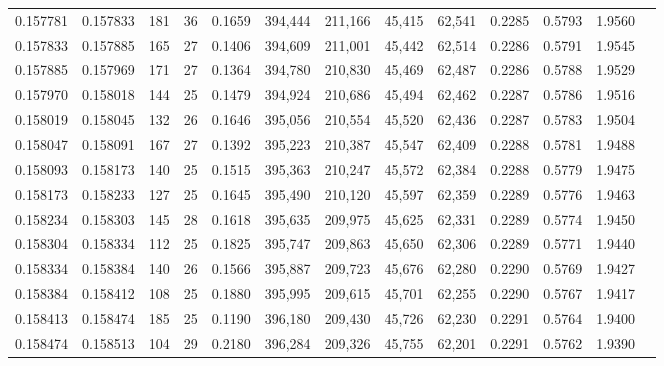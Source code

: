\begin{tabular}{rrrrrrrrrrrrr}
0.157781 & 0.157833 & 181 &  36 &                                     0.1659 & 394,444 & 211,166 &  45,415 &  62,541 & 0.2285 & 0.5793 & 1.9560 \\
0.157833 & 0.157885 & 165 &  27 &                                     0.1406 & 394,609 & 211,001 &  45,442 &  62,514 & 0.2286 & 0.5791 & 1.9545 \\
0.157885 & 0.157969 & 171 &  27 &                                     0.1364 & 394,780 & 210,830 &  45,469 &  62,487 & 0.2286 & 0.5788 & 1.9529 \\
0.157970 & 0.158018 & 144 &  25 &                                     0.1479 & 394,924 & 210,686 &  45,494 &  62,462 & 0.2287 & 0.5786 & 1.9516 \\
0.158019 & 0.158045 & 132 &  26 &                                     0.1646 & 395,056 & 210,554 &  45,520 &  62,436 & 0.2287 & 0.5783 & 1.9504 \\
0.158047 & 0.158091 & 167 &  27 &                                     0.1392 & 395,223 & 210,387 &  45,547 &  62,409 & 0.2288 & 0.5781 & 1.9488 \\
0.158093 & 0.158173 & 140 &  25 &                                     0.1515 & 395,363 & 210,247 &  45,572 &  62,384 & 0.2288 & 0.5779 & 1.9475 \\
0.158173 & 0.158233 & 127 &  25 &                                     0.1645 & 395,490 & 210,120 &  45,597 &  62,359 & 0.2289 & 0.5776 & 1.9463 \\
0.158234 & 0.158303 & 145 &  28 &                                     0.1618 & 395,635 & 209,975 &  45,625 &  62,331 & 0.2289 & 0.5774 & 1.9450 \\
0.158304 & 0.158334 & 112 &  25 &                                     0.1825 & 395,747 & 209,863 &  45,650 &  62,306 & 0.2289 & 0.5771 & 1.9440 \\
0.158334 & 0.158384 & 140 &  26 &                                     0.1566 & 395,887 & 209,723 &  45,676 &  62,280 & 0.2290 & 0.5769 & 1.9427 \\
0.158384 & 0.158412 & 108 &  25 &                                     0.1880 & 395,995 & 209,615 &  45,701 &  62,255 & 0.2290 & 0.5767 & 1.9417 \\
0.158413 & 0.158474 & 185 &  25 &                                     0.1190 & 396,180 & 209,430 &  45,726 &  62,230 & 0.2291 & 0.5764 & 1.9400 \\
0.158474 & 0.158513 & 104 &  29 &                                     0.2180 & 396,284 & 209,326 &  45,755 &  62,201 & 0.2291 & 0.5762 & 1.9390 \\

\end{tabular}
